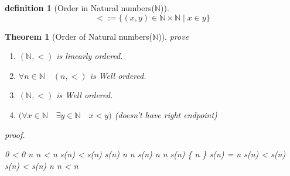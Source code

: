 \documentclass[10pt,a4paper]{book}
\let\emptyset\varnothing
\newtheorem{definition}{definition}[section]
\newtheorem{theorem}{Theorem}[section]
\begin{document}
\begin{definition}
    [Order in Natural numbers($\mathbb{N}$)]

    \[
        < := \{ (x,y) \in \mathbb{N} \times \mathbb{N}  \mid x \in y \}
    \]
\end{definition}

\begin{theorem}
    [Order of Natural numbers($\mathbb{N}$)] prove
    \begin{enumerate}
        \setlength{\itemsep}{0pt} %
        \item        $ (\mathbb{N} , <  )  $ is linearly ordered. 
        \item        $ \forall n \in \mathbb{N} \quad (n , <  )  $ is Well ordered.
        \item        $ (\mathbb{N} , <  )  $ is Well ordered.
        \item       $ \Big( \forall x \in \mathbb{N} \quad   \exists y \in \mathbb{N} \quad  x < y \Big)  $ (doesn't have right endpoint)
    \end{enumerate}

    proof.

    \begin{fitchproof}[arrayenv=tabular]

         { 0 \not< 0 }         \by{$def \emptyset $}{}
        \open
         {n\in {} }                                   
        \open
         { n \not< n }                                   
        \open
         { s(n) < s(n) }                                 
        \open
         { s(n) \in n }                                    
         {  n \in s(n)  }                                 
         {  n \in n  }                                       
         {\bot}                                              
        \close
        \open
         { s(n) \in \{ n \} }                              
         { s(n) = n  }
         { s(n) \not< s(n) }                               
         {\bot}                                              
        \close
         {\bot}                                             
        \close
         { s(n) \not< s(n) }                                 
        \close
        \close
         {\forall n \in {} \quad  n \not< n }         


\end{fitchproof}
\end{theorem}
\end{document}
